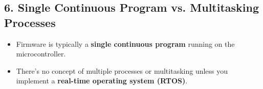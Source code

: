 \documentclass{article}
\begin{document}
\subsection*{6. Single Continuous Program vs. Multitasking Processes}
\begin{itemize}
    \item Firmware is typically a \textbf{single continuous program} running on the microcontroller. 
    \item There’s no concept of multiple processes or multitasking unless you implement a \textbf{real-time operating system (RTOS)}.
\end{itemize}
\end{document}

